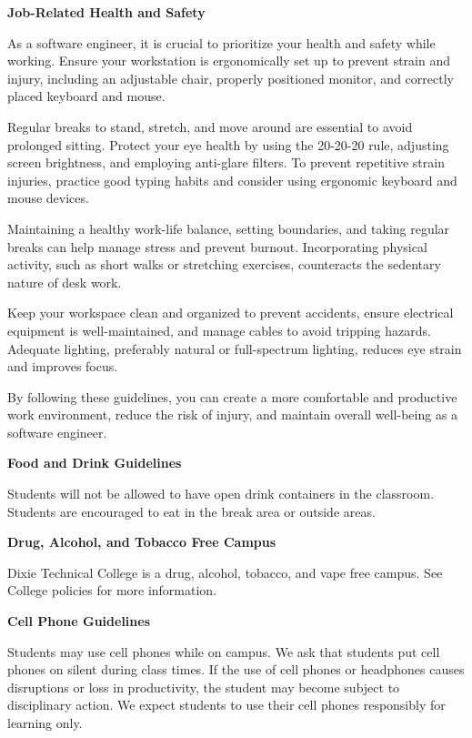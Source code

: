 \textbf{Job-Related Health and Safety}
\par
As a software engineer, it is crucial to
prioritize your health and safety while working.
Ensure your workstation is ergonomically set up
to prevent strain and injury, including an adjustable
chair, properly positioned monitor, and correctly
placed keyboard and mouse.
\par
\bigskip
Regular breaks to stand, stretch, and move around
are essential to avoid prolonged sitting. Protect
your eye health by using the 20-20-20 rule, adjusting
screen brightness, and employing anti-glare filters.
To prevent repetitive strain injuries, practice good
typing habits and consider using ergonomic keyboard
and mouse devices.
\par
\bigskip
Maintaining a healthy work-life balance, setting
boundaries, and taking regular breaks can help
manage stress and prevent burnout. Incorporating
physical activity, such as short walks or stretching
exercises, counteracts the sedentary nature of desk work.
\par
\bigskip
Keep your workspace clean and organized to prevent
accidents, ensure electrical equipment is well-maintained,
and manage cables to avoid tripping hazards.
Adequate lighting, preferably natural or full-spectrum
lighting, reduces eye strain and improves focus.
\par
\bigskip
By following these guidelines, you can create a more
comfortable and productive work environment, reduce
the risk of injury, and maintain overall well-being
as a software engineer.
\par
\bigskip
\textbf{Food and Drink Guidelines}
\par
Students will not be allowed to have open drink
containers in the classroom. Students are encouraged
to eat in the break area or outside areas.
\par
\bigskip
\textbf{Drug, Alcohol, and Tobacco Free Campus}
\par
Dixie Technical College is a drug, alcohol,
tobacco, and vape free campus. See College
policies for more information.
\par
\bigskip
\textbf{Cell Phone Guidelines}
\par
Students may use cell phones while on campus.
We ask that students put cell phones on silent
during class times. If the use of cell phones
or headphones causes disruptions or loss in
productivity, the student may become subject
to disciplinary action. We expect students to
use their cell phones responsibly for learning only.
